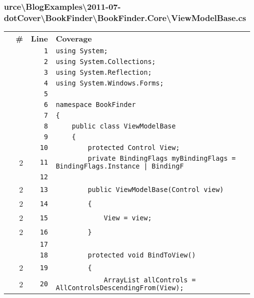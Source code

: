 \documentclass[a4paper,10pt]{article}
\begin{document}
\subsubsection{urce\textbackslash BlogExamples\textbackslash 2011-07-dotCover\textbackslash BookFinder\textbackslash BookFinder.Core\textbackslash ViewModelBase.cs}
\begin{longtable}[l]{lrrl}
\textbf{} & \textbf{\#} & \textbf{Line} & \textbf{Coverage}\\
\cellcolor{gray} &  & \verb~1~ & \verb~using System;~\\
\cellcolor{gray} &  & \verb~2~ & \verb~using System.Collections;~\\
\cellcolor{gray} &  & \verb~3~ & \verb~using System.Reflection;~\\
\cellcolor{gray} &  & \verb~4~ & \verb~using System.Windows.Forms;~\\
\cellcolor{gray} &  & \verb~5~ & \verb~~\\
\cellcolor{gray} &  & \verb~6~ & \verb~namespace BookFinder~\\
\cellcolor{gray} &  & \verb~7~ & \verb~{~\\
\cellcolor{gray} &  & \verb~8~ & \verb~    public class ViewModelBase~\\
\cellcolor{gray} &  & \verb~9~ & \verb~    {~\\
\cellcolor{gray} &  & \verb~10~ & \verb~        protected Control View;~\\
\cellcolor{green} & 2 & \verb~11~ & \verb~        private BindingFlags myBindingFlags = BindingFlags.Instance | BindingF~\\
\cellcolor{gray} &  & \verb~12~ & \verb~~\\
\cellcolor{green} & 2 & \verb~13~ & \verb~        public ViewModelBase(Control view)~\\
\cellcolor{green} & 2 & \verb~14~ & \verb~        {~\\
\cellcolor{green} & 2 & \verb~15~ & \verb~            View = view;~\\
\cellcolor{green} & 2 & \verb~16~ & \verb~        }~\\
\cellcolor{gray} &  & \verb~17~ & \verb~~\\
\cellcolor{gray} &  & \verb~18~ & \verb~        protected void BindToView()~\\
\cellcolor{green} & 2 & \verb~19~ & \verb~        {~\\
\cellcolor{green} & 2 & \verb~20~ & \verb~            ArrayList allControls = AllControlsDescendingFrom(View);~\\

\end{longtable}
\end{document}
